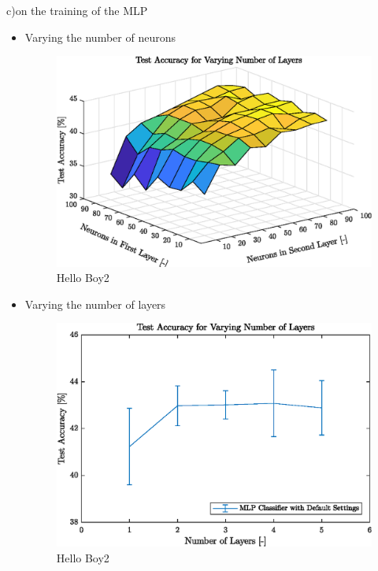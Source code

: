 c)on the training of the MLP
\begin{itemize}
   	\item Varying the number of neurons

	\begin{figure}[h!]
   		 \centering
   		 \includegraphics{images/surfacelayers}
   		 \caption{Hello Boy2}
   		 \label{fig:surfaceLayers}
    \end{figure}

	\item Varying the number of layers

	  	\begin{figure}[h!]
	  		\centering
	  		\includegraphics{images/numberlayers}
	  		\caption{Hello Boy2}
	  		\label{fig:test2}
	  	\end{figure}
\end{itemize}

